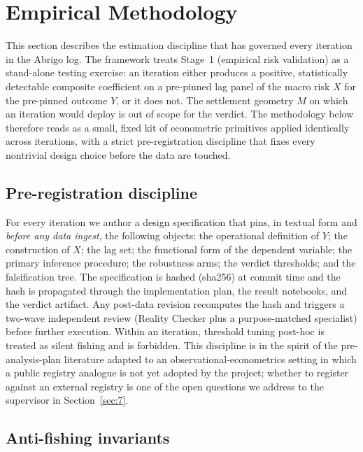 \section{Empirical Methodology}\label{sec:5}

This section describes the estimation discipline that has governed every
iteration in the Abrigo log. The framework treats Stage~1 (empirical risk
validation) as a stand-alone testing exercise: an iteration either produces a
positive, statistically detectable composite coefficient on a pre-pinned lag
panel of the macro risk \(X\) for the pre-pinned outcome \(Y\), or it does
not. The settlement geometry \(M\) on which an iteration would deploy is out
of scope for the verdict. The methodology below therefore reads as a small,
fixed kit of econometric primitives applied identically across iterations,
with a strict pre-registration discipline that fixes every nontrivial design
choice before the data are touched.

\subsection{Pre-registration discipline}\label{sec:5.1}

For every iteration we author a design specification that pins, in textual
form and \emph{before any data ingest}, the following objects: the operational
definition of \(Y\); the construction of \(X\); the lag set; the functional
form of the dependent variable; the primary inference procedure; the
robustness arms; the verdict thresholds; and the falsification tree. The
specification is hashed (sha256) at commit time and the hash is propagated
through the implementation plan, the result notebooks, and the verdict
artifact. Any post-data revision recomputes the hash and triggers a
two-wave independent review (Reality Checker plus a purpose-matched
specialist) before further execution. Within an iteration, threshold tuning
post-hoc is treated as silent fishing and is forbidden. This discipline is
in the spirit of the pre-analysis-plan literature \citep{olken2015,
christensenmiguel2018} adapted to an observational-econometrics setting in
which a public registry analogue is not yet adopted by the project; whether
to register against an external registry is one of the open questions we
address to the supervisor in Section~\ref{sec:7}.

\subsection{Anti-fishing invariants}\label{sec:5.2}

